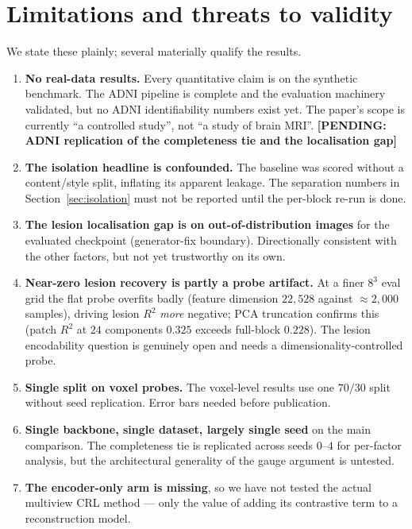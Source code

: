 \documentclass[11pt]{article}
\newcommand{\pending}[1]{{\color{red}\textbf{[PENDING: #1]}}}
\begin{document}
\section{Limitations and threats to validity}
\label{sec:limitations}

We state these plainly; several materially qualify the results.

\begin{enumerate}
\item \textbf{No real-data results.} Every quantitative claim is on the
synthetic benchmark. The ADNI pipeline is complete and the evaluation machinery
validated, but no ADNI identifiability numbers exist yet. The paper's scope is
currently ``a controlled study'', not ``a study of brain MRI''.
\pending{ADNI replication of the completeness tie and the localisation gap}

\item \textbf{The isolation headline is confounded.} The baseline was scored
without a content/style split, inflating its apparent leakage. The
separation numbers in Section~\ref{sec:isolation} must not be reported until the
per-block re-run is done.

\item \textbf{The lesion localisation gap is on out-of-distribution images} for
the evaluated checkpoint (generator-fix boundary). Directionally consistent with
the other factors, but not yet trustworthy on its own.

\item \textbf{Near-zero lesion recovery is partly a probe artifact.} At a finer
$8^3$ eval grid the flat probe overfits badly (feature dimension $22{,}528$
against $\approx\!2{,}000$ samples), driving lesion $R^2$ \emph{more} negative;
PCA truncation confirms this (patch $R^2$ at $24$ components $0.325$ exceeds
full-block $0.228$). The lesion encodability question is genuinely open and
needs a dimensionality-controlled probe.

\item \textbf{Single split on voxel probes.} The voxel-level results use one
$70/30$ split without seed replication. Error bars needed before publication.

\item \textbf{Single backbone, single dataset, largely single seed} on the main
comparison. The completeness tie is replicated across seeds $0$--$4$ for
per-factor analysis, but the architectural generality of the gauge argument is
untested.

\item \textbf{The encoder-only arm is missing}, so we have not tested the actual
multiview CRL method --- only the value of adding its contrastive term to a
reconstruction model.
\end{enumerate}
\end{document}
